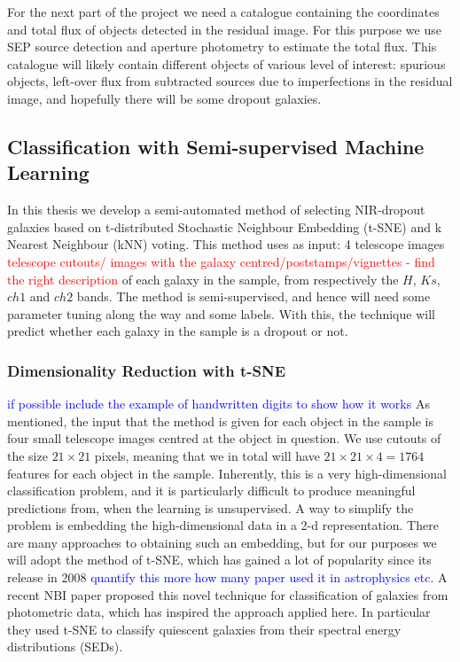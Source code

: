 For the next part of the project we need a catalogue containing the coordinates and total flux of objects detected in the residual image. For this purpose we use SEP source detection and aperture photometry to estimate the total flux. This catalogue will likely contain different objects of various level of interest: spurious objects, left-over flux from subtracted sources due to imperfections in the residual image, and hopefully there will be some dropout galaxies.

\subsection{Classification with Semi-supervised Machine Learning}
In this thesis we develop a semi-automated method of selecting NIR-dropout galaxies based on t-distributed Stochastic Neighbour Embedding (t-SNE) \cite{Maaten_2008_tSNE} and k Nearest Neighbour (kNN) voting. This method uses as input: 4 telescope images \textcolor{red}{telescope cutouts/ images with the galaxy centred/poststamps/vignettes - find the right description} of each galaxy in the sample, from respectively the $H$, $Ks$, $ch1$ and $ch2$ bands. The method is semi-supervised, and hence will need some parameter tuning along the way and some labels. With this, the technique will predict whether each galaxy in the sample is a dropout or not.

\subsubsection{Dimensionality Reduction with t-SNE}
\textcolor{blue}{if possible include the example of handwritten digits to show how it works}
As mentioned, the input that the method is given for each object in the sample is four small telescope images centred at the object in question. We use cutouts of the size $21\!\times\!21$ pixels, meaning that we in total will have $21\times21\times4=1764$ features for each object in the sample. Inherently, this is a very high-dimensional classification problem, and it is particularly difficult to produce meaningful predictions from, when the learning is unsupervised. A way to simplify the problem is embedding the high-dimensional data in a 2-d representation. There are many approaches to obtaining such an embedding, but for our purposes we will adopt the method of t-SNE, which has gained a lot of popularity since its release in 2008 \textcolor{blue}{quantify this more how many paper used it in astrophysics etc}. A recent NBI paper \cite{Steinhardt_2020} proposed this novel technique for classification of galaxies from photometric data, which has inspired the approach applied here. In particular they used t-SNE to classify quiescent galaxies from their spectral energy distributions (SEDs). \\

